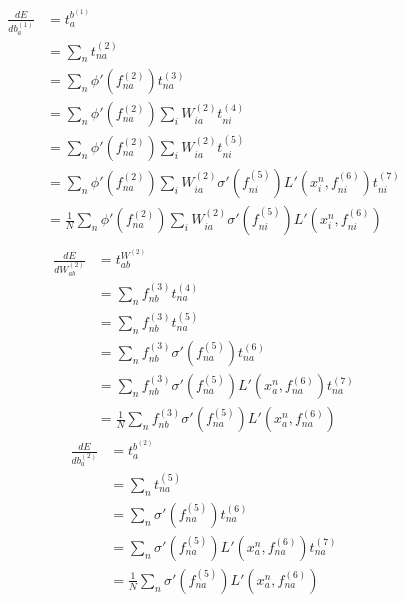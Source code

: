 \documentclass[fleqn]{report}
\begin{document}
\begin{equation}
    \begin{split}
        \frac{d E}{d b^{(1)}_{a}} & = t^{b^{(1)}}_{a} \\
        & = \sum_n t^{(2)}_{na} \\
        & = \sum_n \phi ' \left (f^{(2)}_{na}\right) t^{(3)}_{na} \\
        & = \sum_n \phi ' \left (f^{(2)}_{na}\right) \sum_i W^{(2)}_{ia} t^{(4)}_{ni} \\
        & = \sum_n \phi ' \left (f^{(2)}_{na}\right) \sum_i W^{(2)}_{ia} t^{(5)}_{ni} \\
        & = \sum_n \phi ' \left (f^{(2)}_{na}\right) \sum_i W^{(2)}_{ia} \sigma'\left(f^{(5)}_{ni}\right) L'\left(x^n_i, f^{(6)}_{ni}\right) t^{(7)}_{ni} \\
        & = \frac{1}{N} \sum_n \phi ' \left (f^{(2)}_{na}\right) \sum_i W^{(2)}_{ia} \sigma'\left(f^{(5)}_{ni}\right) L'\left(x^n_i, f^{(6)}_{ni}\right) \\
    \end{split}
\end{equation}
\begin{equation}
    \begin{split}
        \frac{d E}{d W^{(2)}_{ab}} & = t^{W^{(2)}}_{ab} \\
        & = \sum_n f^{(3)}_{nb} t^{(4)}_{na} \\
        & = \sum_n f^{(3)}_{nb} t^{(5)}_{na} \\
        & = \sum_n f^{(3)}_{nb} \sigma'\left(f^{(5)}_{na}\right) t^{(6)}_{na} \\
        & = \sum_n f^{(3)}_{nb} \sigma'\left(f^{(5)}_{na}\right) L'\left(x^n_a, f^{(6)}_{na}\right) t^{(7)}_{na} \\
        & = \frac{1}{N} \sum_n f^{(3)}_{nb} \sigma'\left(f^{(5)}_{na}\right) L'\left(x^n_a, f^{(6)}_{na}\right)
    \end{split}
\end{equation}
\begin{equation}
    \begin{split}
        \frac{d E}{d b^{(2)}_{a}} & = t^{b^{(2)}}_{a} \\
        & = \sum_n t^{(5)}_{na} \\
        & = \sum_n \sigma'\left(f^{(5)}_{na}\right) t^{(6)}_{na} \\
        & = \sum_n \sigma'\left(f^{(5)}_{na}\right) L'\left(x^n_a, f^{(6)}_{na}\right) t^{(7)}_{na} \\
        & = \frac{1}{N} \sum_n \sigma'\left(f^{(5)}_{na}\right) L'\left(x^n_a, f^{(6)}_{na}\right)
    \end{split}
\end{equation}
\end{document}
